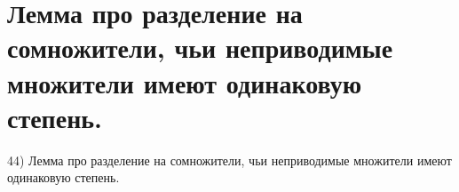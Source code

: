 \section{
 Лемма про разделение на сомножители, чьи неприводимые множители имеют одинаковую степень.
}

44) Лемма про разделение на сомножители, чьи неприводимые множители имеют одинаковую степень.
